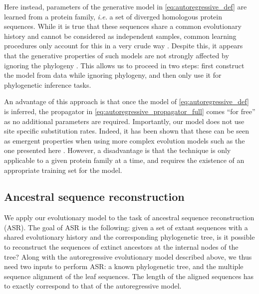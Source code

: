 Here instead, parameters of the generative model in \eqref{eq:autoregressive_def} are learned from a protein family, \emph{i.e.} a set of diverged homologous protein sequences. 
While it is true that these sequences share a common evolutionary history and cannot be considered as independent samples, common learning procedures only account for this in a very crude way \cite{cocco_inversestatisticalphysics_2018,trinquier_efficientgenerativemodeling_2021}.
Despite this, it appears that the generative properties of such models are not strongly affected by ignoring the phylogeny \cite{hockenberry_phylogeneticweightingdoes_2019,rodriguezhorta_effectphylogeneticcorrelations_2021}. 
This allows us to proceed in two steps: first construct the model from data while ignoring phylogeny, and then only use it for phylogenetic inference tasks.

An advantage of this approach is that once the model of \eqref{eq:autoregressive_def} is inferred, the propagator in \eqref{eq:autoregressive_propagator_full} comes ``for free'' as no additional parameters are required. 
Importantly, our model does not use site specific substitution rates. 
Indeed, it has been shown that these can be seen as emergent properties when using more complex evolution models such as the one presented here \cite{delapaz_epistaticcontributionspromote_2020}.
However, a disadvantage is that the technique is only applicable to a given protein family at a time, and requires the existence of an appropriate training set for the model. 


\subsection{Ancestral sequence reconstruction}

We apply our evolutionary model to the task of ancestral sequence reconstruction (ASR). 
The goal of ASR is the following: given a set of extant sequences with a shared evolutionary history and the corresponding phylogenetic tree, is it possible to reconstruct the sequences of extinct ancestors at the internal nodes of the tree? 
Along with the autoregressive evolutionary model described above, we thus need two inputs to perform ASR: a known phylogenetic tree, and the multiple sequence alignment of the leaf sequences. 
The length of the aligned sequences has to exactly correspond to that of the autoregressive model. 

